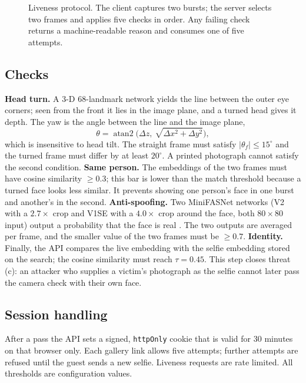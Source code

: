 \documentclass[conference]{IEEEtran}
\begin{document}
\begin{figure}[!t]
\centering
\resizebox{0.97\textwidth}{!}{}
\caption{Liveness protocol. The client captures two bursts; the server selects two frames and applies five checks in order. Any failing check returns a machine-readable reason and consumes one of five attempts.}
\label{fig:liveness}
\end{figure}

\subsection{Checks}
\textbf{Head turn.} A 3-D 68-landmark network yields the line between the outer eye corners; seen from the front it lies in the image plane, and a turned head gives it depth. The yaw is the angle between the line and the image plane,
\begin{equation}
\theta=\operatorname{atan2}\!\big(\Delta z,\ \sqrt{\Delta x^{2}+\Delta y^{2}}\big),
\label{eq:yaw}
\end{equation}
which is insensitive to head tilt. The straight frame must satisfy $|\theta_f|\le15^\circ$ and the turned frame must differ by at least $20^\circ$. A printed photograph cannot satisfy the second condition.
\textbf{Same person.} The embeddings of the two frames must have cosine similarity $\ge0.3$; this bar is lower than the match threshold because a turned face looks less similar. It prevents showing one person's face in one burst and another's in the second.
\textbf{Anti-spoofing.} Two MiniFASNet networks (V2 with a $2.7\times$ crop and V1SE with a $4.0\times$ crop around the face, both $80\times80$ input) output a probability that the face is real \cite{minivision}. The two outputs are averaged per frame, and the smaller value of the two frames must be $\ge0.7$.
\textbf{Identity.} Finally, the API compares the live embedding with the selfie embedding stored on the search; the cosine similarity must reach $\tau=0.45$. This step closes threat (c): an attacker who supplies a victim's photograph as the selfie cannot later pass the camera check with their own face.

\subsection{Session handling}
After a pass the API sets a signed, \texttt{httpOnly} cookie that is valid for 30 minutes on that browser only. Each gallery link allows five attempts; further attempts are refused until the guest sends a new selfie. Liveness requests are rate limited. All thresholds are configuration values.
\end{document}
